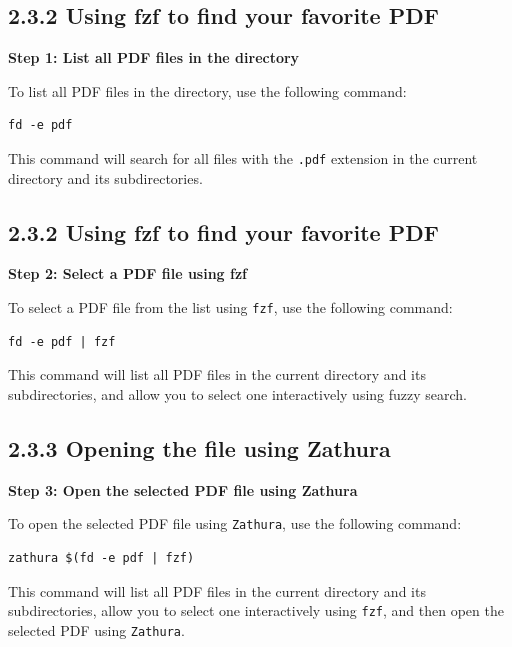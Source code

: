 \documentclass{article}
\begin{document}
\subsection*{2.3.2 Using fzf to find your favorite PDF}

\textbf{Step 1: List all PDF files in the directory}

To list all PDF files in the directory, use the following command:

\begin{verbatim}
fd -e pdf
\end{verbatim}

This command will search for all files with the \texttt{.pdf} extension in the current directory and its subdirectories.







\subsection*{2.3.2 Using fzf to find your favorite PDF}

\textbf{Step 2: Select a PDF file using fzf}

To select a PDF file from the list using \texttt{fzf}, use the following command:

\begin{verbatim}
fd -e pdf | fzf
\end{verbatim}

This command will list all PDF files in the current directory and its subdirectories, and allow you to select one interactively using fuzzy search.








\subsection*{2.3.3 Opening the file using Zathura}

\textbf{Step 3: Open the selected PDF file using Zathura}

To open the selected PDF file using \texttt{Zathura}, use the following command:

\begin{verbatim}
zathura $(fd -e pdf | fzf)
\end{verbatim}
This command will list all PDF files in the current directory and its subdirectories, allow you to select one interactively using \texttt{fzf}, and then open the selected PDF using \texttt{Zathura}.
\end{document}
